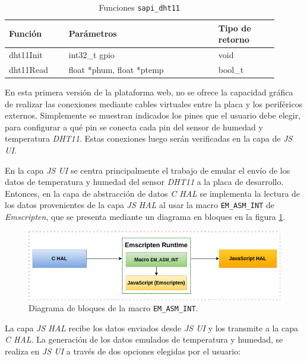 \begin{table}[h]
	\centering
	\caption[Funciones \texttt{sapi\_dht11}]{Funciones \texttt{sapi\_dht11}}
	\begin{tabular}{p{0.20\linewidth} p{0.50\linewidth}  p{0.20\linewidth}}    
		\toprule
		\textbf{Función} 	 & \textbf{Parámetros} 		& \textbf{Tipo de retorno}  \\
		\midrule
		dht11Init & int32\_t gpio		&  void \\		
		dht11Read	 & float *phum, float *ptemp	&  bool\_t \\
		\bottomrule
		\hline
	\end{tabular}
	\label{tab:sapiDht11}
\end{table}

En esta primera versión de la plataforma web, no se ofrece la capacidad gráfica de realizar las conexiones mediante cables virtuales entre la placa y los periféricos externos. Simplemente se muestran indicados los pines que el usuario debe elegir, para configurar a qué pin se conecta cada pin del sensor de humedad y temperatura \textit{DHT11}. Estas conexiones luego serán verificadas en la capa de \textit{JS UI}.

En la capa \textit{JS UI} se centra principalmente el trabajo de emular el envío de los datos de temperatura y humedad del sensor \textit{DHT11} a la placa de desarrollo.
Entonces, en la capa de abstracción de datos \textit{C HAL} se implementa la lectura de los datos provenientes de la capa \textit{JS HAL} al usar la macro \texttt{EM\_ASM\_INT} de \textit{Emscripten}, que se presenta mediante un diagrama en bloques en la figura \ref{fig:dht11Emscripten}.

\begin{figure}[ht]
	\centering
	\includegraphics[scale=.55]{./Figures/dht11Emscripten.png}
	\caption{Diagrama de bloques de la macro \texttt{EM\_ASM\_INT}.}
	\label{fig:dht11Emscripten}
\end{figure}

La capa \textit{JS HAL} recibe los datos enviados desde \textit{JS UI} y los transmite a la capa \textit{C HAL}. La generación de los datos  emulados de temperatura y humedad, se realiza en \textit{JS UI} a través de dos opciones elegidas por el usuario:
 
